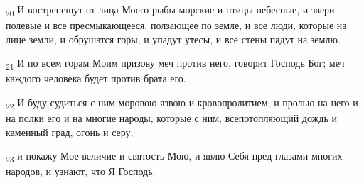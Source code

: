 \begin{tcolorbox}
\textsubscript{20} И вострепещут от лица Моего рыбы морские и птицы небесные, и звери полевые и все пресмыкающееся, ползающее по земле, и все люди, которые на лице земли, и обрушатся горы, и упадут утесы, и все стены падут на землю.
\end{tcolorbox}
\begin{tcolorbox}
\textsubscript{21} И по всем горам Моим призову меч против него, говорит Господь Бог; меч каждого человека будет против брата его.
\end{tcolorbox}
\begin{tcolorbox}
\textsubscript{22} И буду судиться с ним моровою язвою и кровопролитием, и пролью на него и на полки его и на многие народы, которые с ним, всепотопляющий дождь и каменный град, огонь и серу;
\end{tcolorbox}
\begin{tcolorbox}
\textsubscript{23} и покажу Мое величие и святость Мою, и явлю Себя пред глазами многих народов, и узнают, что Я Господь.
\end{tcolorbox}
